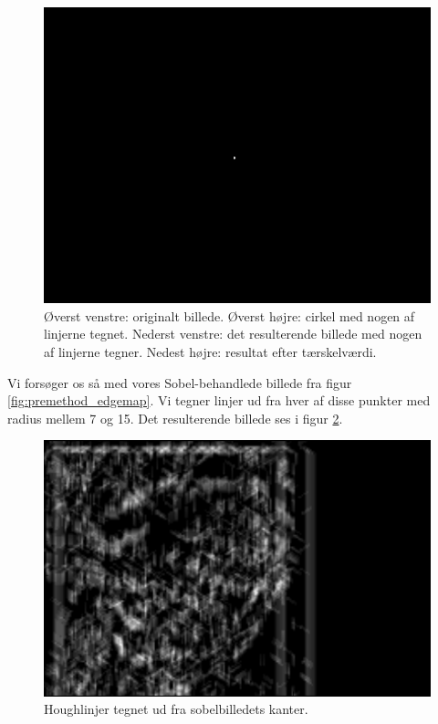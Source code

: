 \begin{figure}[H]
\begin{minipage}[b]{0.5\linewidth}
	\end{minipage}
	\hspace{0.5cm}
	\begin{minipage}[b]{0.5\linewidth}
		\centering
		\includegraphics[scale=1.5]{files/premethod/img/dirmap4.png}
	\end{minipage}
	\caption{Øverst venstre: originalt billede. Øverst højre: cirkel med nogen af linjerne tegnet. Nederst venstre: det resulterende billede med nogen af linjerne tegner. Nedest højre: resultat efter tærskelværdi.\label{fig:premethod_houghres}}
\end{figure}

Vi forsøger os så med vores Sobel-behandlede billede fra figur \ref{fig:premethod_edgemap}. Vi tegner linjer ud fra hver af disse punkter med radius mellem 7 og 15. Det resulterende billede ses i figur \ref{fig:premethod_houghCellLines}. 

\begin{figure}[H]
	\centering
	\includegraphics[scale=0.8]{files/premethod/img/houghCell2.png}
	\caption{Houghlinjer tegnet ud fra sobelbilledets kanter.\label{fig:premethod_houghCellLines}}
\end{figure}

